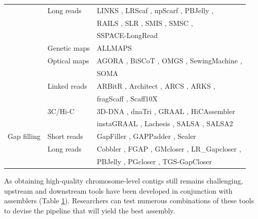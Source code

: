 \begin{table}
\begin{tabular}{|l|l|l|}
    & Long reads & LINKS \cite{links}, LRScaf \cite{lrscaf}, npScarf \cite{npScarf}, PBJelly \cite{pbjelly}, \\
    &  & RAILS \cite{rails}, SLR \cite{slr}, SMIS \cite{smis}, SMSC \cite{smsc}, \\
    &  & SSPACE-LongRead \cite{sspace-longread} \\
    \cline{2-3}
    & Genetic maps & ALLMAPS \cite{allmaps} \\
    \cline{2-3}
    & Optical maps & AGORA \cite{agora}, BiSCoT \cite{biscot}, OMGS \cite{omgs}, SewingMachine \cite{sewingmachine}, \\
    &  & SOMA \cite{soma} \\
    \cline{2-3}
    & Linked reads & ARBitR \cite{arbitr}, Architect \cite{architect}, ARCS \cite{arcs}, ARKS \cite{arks}, \\ 
    &  & fragScaff \cite{fragscaff}, Scaff10X \cite{scaff10X} \\
    \cline{2-3}
    & 3C/Hi-C & 3D-DNA \cite{3d-dna}, dnaTri \cite{dnatri}, GRAAL \cite{graal}, HiCAssembler \cite{hicassembler} \\
    &  & instaGRAAL \cite{instagraal}, Lachesis \cite{lachesis}, SALSA \cite{salsa}, SALSA2 \cite{salsa2} \\
\hline
Gap filling & Short reads & GapFiller \cite{gapfiller}, GAPPadder \cite{gappadder}, Sealer \cite{sealer} \\
    \cline{2-3}
    & Long reads & Cobbler \cite{rails}, FGAP \cite{fgap}, GMcloser \cite{gmcloser}, LR\_Gapcloser \cite{lrgapcloser}, \\
    &  & PBJelly \cite{pbjelly}, PGcloser \cite{pgcloser}, TGS-GapCloser \cite{tgsgapcloser} \\
\hline
\end{tabular}
\label{tab:scaffolding}
\end{table}

As obtaining high-quality chromosome-level contigs still remains challenging, upstream and downstream tools have been developed in conjunction with assemblers (Table \ref{tab:scaffolding}). Researchers can test numerous combinations of these tools to devise the pipeline that will yield the best assembly. \\

